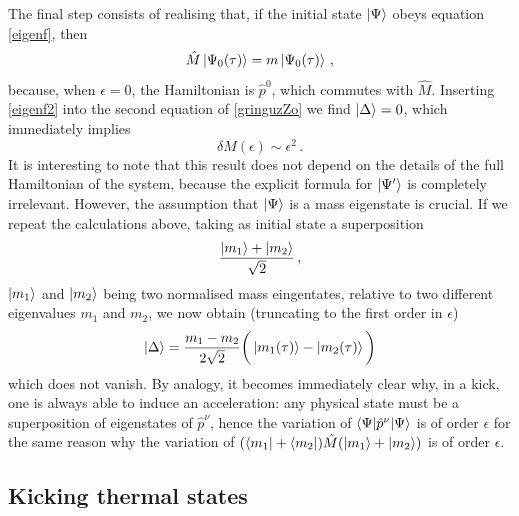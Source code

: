 \documentclass[twocolumn,usenatbib]{mnras2}
\begin{document}
The final step consists of realising that, if the initial state $\ket{\Psi}$ obeys equation \eqref{eigenf}, then 
\begin{equation}\label{eigenf2}
    \hat{M}\ket{\Psi_0 (\tau)} = m \ket{\Psi_0 (\tau)} \, ,
\end{equation}
because, when $\epsilon=0$, the Hamiltonian is $\hat{p}^0$, which commutes with $\hat{M}$. Inserting \eqref{eigenf2} into the second equation of \eqref{gringuzZo} we find $\ket{\Delta}=0$, which immediately implies
\begin{equation}\label{felixfelicis}
    \delta M (\epsilon) \sim \epsilon^2 \, .
\end{equation}
It is interesting to note that this result does not depend on the details of the full Hamiltonian of the system, because the explicit formula for $\ket{\Psi'}$ is completely irrelevant. However, the assumption that $\ket{\Psi}$ is a mass eigenstate is crucial. If we repeat the calculations above, taking as initial state a superposition
\begin{equation}
   \dfrac{ \ket{m_1} + \ket{m_2}}{\sqrt{2}} \, ,
\end{equation}
$\ket{m_1}$ and $\ket{m_2}$ being two normalised mass eingentates, relative to two different eigenvalues $m_1$ and $m_2$, we now obtain (truncating to the first order in $\epsilon$)
\begin{equation}\label{ghgh}
   \ket{\Delta} = \dfrac{m_1 -m_2}{2\sqrt{2}} \bigg(\ket{m_{1}(\tau)}-\ket{m_{2}(\tau)} \bigg)
\end{equation}
which does not vanish. By analogy, it becomes immediately clear why, in a kick, one is always able to induce an acceleration: any physical state must be a superposition of eigenstates of $\hat{p}^\nu$, hence the variation of $\braket{\Psi|\hat{p}^\nu|\Psi}$ is of order $\epsilon$ for the same reason why the variation of $(\bra{m_1}+ \bra{m_2}) \hat{M} (\ket{m_1}+\ket{m_2})$ is of order $\epsilon$.




\subsection{Kicking thermal states}
\end{document}
